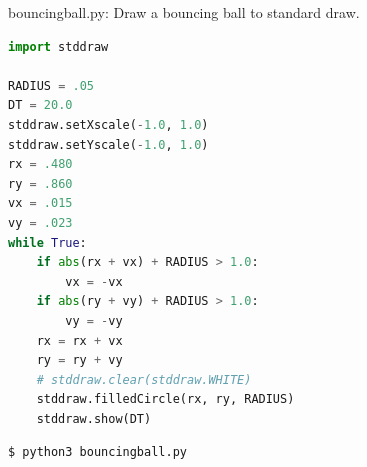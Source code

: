 \documentclass[8pt,a4paper,compress]{beamer}
\begin{document}
\begin{frame}[fragile]
\pause

\begin{framed}
\tiny bouncingball.py: Draw a bouncing ball to standard draw.
\end{framed}

\begin{lstlisting}[language=Python,style=focusin]
import stddraw

RADIUS = .05
DT = 20.0
stddraw.setXscale(-1.0, 1.0)
stddraw.setYscale(-1.0, 1.0)
rx = .480
ry = .860
vx = .015
vy = .023
while True:
    if abs(rx + vx) + RADIUS > 1.0:
        vx = -vx
    if abs(ry + vy) + RADIUS > 1.0:
        vy = -vy
    rx = rx + vx
    ry = ry + vy
    # stddraw.clear(stddraw.WHITE)
    stddraw.filledCircle(rx, ry, RADIUS)
    stddraw.show(DT)
\end{lstlisting}

\pause

\begin{minipage}{150pt}
\begin{lstlisting}[language={},style=focusin]
$ python3 bouncingball.py
\end{lstlisting}
\end{minipage}%
\begin{minipage}{150pt}
\hfill {}
\end{minipage}
\end{frame}
\end{document}
